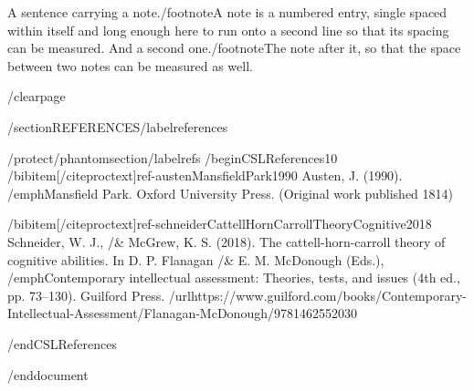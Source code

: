 A sentence carrying a note./footnote{A note is a numbered entry, single
  spaced within itself and long enough here to run onto a second line so
  that its spacing can be measured.} And a second one./footnote{The note
  after it, so that the space between two notes can be measured as well.}

/clearpage

/section{REFERENCES}/label{references}

/protect/phantomsection/label{refs}
/begin{CSLReferences}{1}{0}
/bibitem[/citeproctext]{ref-austenMansfieldPark1990}
Austen, J. (1990). /emph{Mansfield {P}ark}. Oxford University Press.
(Original work published 1814)

/bibitem[/citeproctext]{ref-schneiderCattellHornCarrollTheoryCognitive2018}
Schneider, W. J., /& McGrew, K. S. (2018). The cattell-horn-carroll
theory of cognitive abilities. In D. P. Flanagan /& E. M. McDonough
(Eds.), /emph{Contemporary intellectual assessment: Theories, tests, and
issues} (4th ed., pp. 73--130). Guilford Press.
/url{https://www.guilford.com/books/Contemporary-Intellectual-Assessment/Flanagan-McDonough/9781462552030}

/end{CSLReferences}




/end{document}

